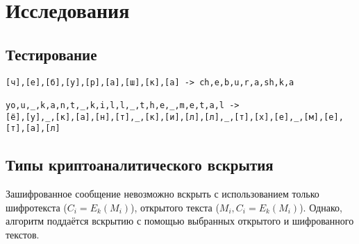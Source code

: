\documentclass[oneside, final, 12pt]{extarticle}
\begin{document}
\lstset{caption=Пользовательский интерфейс}


\lstset{caption=Вычисления}


\section{Исследования}
\subsection*{Тестирование}
\begin{lstlisting}
[ч],[е],[б],[у],[р],[а],[ш],[к],[а] -> ch,e,b,u,r,a,sh,k,a

yo,u,_,k,a,n,t,_,k,i,l,l,_,t,h,e,_,m,e,t,a,l ->
[ё],[у],_,[к],[а],[н],[т],_,[к],[и],[л],[л],_,[т],[х],[е],_,[м],[е],[т],[а],[л]
\end{lstlisting}

\subsection*{Типы криптоаналитического вскрытия}
Зашифрованное сообщение невозможно вскрыть с использованием только шифротекста (\(C_i=E_k(M_i)\)), открытого текста (\(M_i,C_i=E_k(M_i)\)). Однако, алгоритм поддаётся вскрытию с помощью выбранных открытого и шифрованного текстов.
\end{document}
